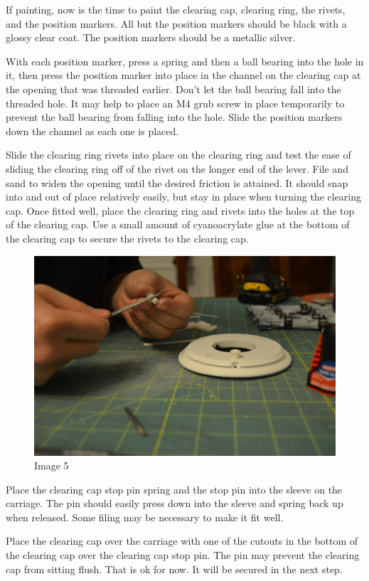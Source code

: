 \documentclass[openany]{book}
\begin{document}
If painting, now is the time to paint the clearing cap, clearing ring, the rivets, and the position markers. All but the position markers should be black with a glossy clear coat. The position markers should be a metallic silver.

With each position marker, press a spring and then a ball bearing into the hole in it, then press the position marker into place in the channel on the clearing cap at the opening that was threaded earlier. Don't let the ball bearing fall into the threaded hole. It may help to place an M4 grub screw in place temporarily to prevent the ball bearing from falling into the hole.
Slide the position markers down the channel as each one is placed.

Slide the clearing ring rivets into place on the clearing ring and test the ease of sliding the clearing ring off of the rivet on the longer end of the lever. File and sand to widen the opening until the desired friction is attained. It should snap into and out of place relatively easily, but stay in place when turning the clearing cap. Once fitted well, place the clearing ring and rivets into the holes at the top of the clearing cap. Use a small amount of cyanoacrylate glue at the bottom of the clearing cap to secure the rivets to the clearing cap.


\begin{figure}[!ht]
	\centering
	\includegraphics[width=.75\textwidth]{images/image5.jpg}
	\caption{Image 5}
	\label{fig:image5}	
\end{figure}


Place the clearing cap stop pin spring and the stop pin into the sleeve on the carriage. The pin should easily press down into the sleeve and spring back up when released. Some filing may be necessary to make it fit well.

Place the clearing cap over the carriage with one of the cutouts in the bottom of the clearing cap over the clearing cap stop pin. The pin may prevent the clearing cap from sitting flush. That is ok for now. It will be secured in the next step.
\end{document}
